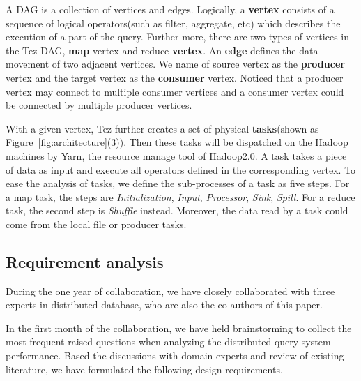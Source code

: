 A DAG is a collection of vertices and edges. Logically, a \textbf{vertex} consists of a sequence of logical operators(such as filter, aggregate, etc) which describes the execution of a part of the query. Further more, there are two types of vertices in the Tez DAG, \textbf{map} vertex and reduce \textbf{vertex}. 
An \textbf{edge} defines the data movement of two adjacent vertices. We name of source vertex as the \textbf{producer} vertex and the target vertex as the \textbf{consumer} vertex. Noticed that a producer vertex may connect to multiple consumer vertices and a consumer vertex could be connected by multiple producer vertices.  

With a given vertex, Tez further creates a set of physical \textbf{tasks}(shown as Figure~\ref{fig:architecture}(3)). Then these tasks will be dispatched on the Hadoop machines by Yarn, the resource manage tool of Hadoop2.0. A task takes a piece of data as input and execute all operators  defined in the corresponding vertex. To ease the analysis of tasks, we define the sub-processes of a task as five steps. For a map task, the steps are \textit{Initialization}, \textit{Input}, \textit{Processor}, \textit{Sink}, \textit{Spill}. For a reduce task, the second step is \textit{Shuffle} instead. Moreover, the data read by a task could come from the local file or producer tasks.

\subsection{Requirement analysis}
During the one year of collaboration, we have closely collaborated with three experts in distributed database, who are also the co-authors of this paper.

In the first month of the collaboration, we have held brainstorming to collect the most frequent raised questions when analyzing the distributed query system performance. Based the discussions with domain experts and review of existing literature, we have formulated the following design requirements.

